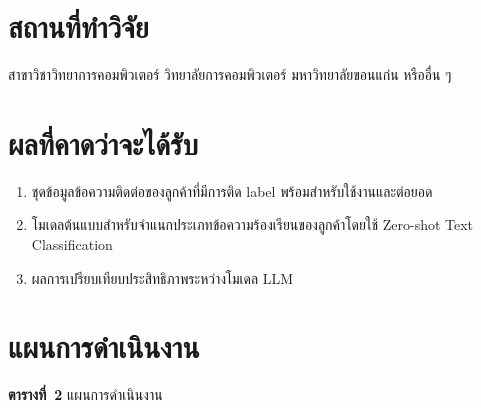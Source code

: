 \section{สถานที่ทำวิจัย}

สาขาวิชาวิทยาการคอมพิวเตอร์ วิทยาลัยการคอมพิวเตอร์ มหาวิทยาลัยขอนแก่น หรืออื่น ๆ

\section{ผลที่คาดว่าจะได้รับ}

\begin{enumerate}
    \item ชุดข้อมูลข้อความติดต่อของลูกค้าที่มีการติด label พร้อมสำหรับใช้งานและต่อยอด
    \item โมเดลต้นแบบสำหรับจำแนกประเภทข้อความร้องเรียนของลูกค้าโดยใช้ Zero-shot Text Classification
    \item ผลการเปรียบเทียบประสิทธิภาพระหว่างโมเดล LLM
\end{enumerate}

\section{แผนการดำเนินงาน}

\noindent\textbf{ตารางที่~2} แผนการดำเนินงาน

